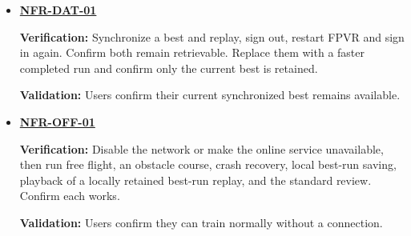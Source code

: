 \documentclass[12pt]{article}
\begin{document}
\begin{itemize}
 and replay, and submit a time using that player's account identifier.
 Confirm all requests are rejected.\par
 \textbf{Validation:} Supervisor review confirms leaderboard results cannot be
 spoofed.
\item \hyperlink{req:NFR-DAT-01}{\textbf{NFR-DAT-01}}\par
 \textbf{Verification:} Synchronize a best and replay, sign out, restart FPVR
 and sign in again. Confirm both remain retrievable. Replace them with a
 faster completed run and confirm only the current best is retained.\par
 \textbf{Validation:} Users confirm their current synchronized best remains available.
\item \hyperlink{req:NFR-OFF-01}{\textbf{NFR-OFF-01}}\par
 \textbf{Verification:} Disable the network or make the online service
 unavailable, then run free flight, an obstacle course, crash recovery, local
 best-run saving, playback of a locally retained best-run replay, and the
 standard review. Confirm each works.\par
 \textbf{Validation:} Users confirm they can train normally without a
 connection.
\end{itemize}
\end{document}
